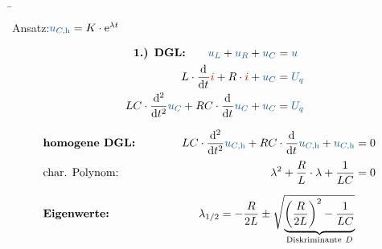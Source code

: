 \begin{frame}\ftx{\subsecname}%
\b{%
\begin{minipage}{\textwidth}\centering
    \begin{minipage}[t][3.5cm][]{0.48\textwidth}\centering
        \vspace{5pt}

        Ansatz:\quad  $\ecv{u_{C,\mathrm{h}}} = K \cdot \mathrm{e}^{\lambda t}$
    \end{minipage}%
    \begin{minipage}[t][3.5cm][]{0.48\textwidth}\centering
    \begin{align*}
        \textbf{1.) DGL:}\qquad
         \ecv{u_L} + \ecv{u_R} +\ecv{u_C} &= \ecv{u} \nonumber\\
        L \cdot \dt \eci{i} + R \cdot \eci{i} + \ecv{u_C}&= \ecv{U_q} \nonumber\\
        LC \cdot \dt[2] \ecv{u_C} + RC \cdot \dt \ecv{u_C} + \ecv{u_C} &= \ecv{U_q} %
    \end{align*}
    \end{minipage}
\end{minipage}\vspace{2pt}

\begin{align*}
    &\textbf{homogene DGL:}&
        LC \cdot \dt[2] \ecv{u_{C,\mathrm{h}}} + RC \cdot \dt \ecv{u_{C,\mathrm{h}}} + \ecv{u_{C,\mathrm{h}}} &= 0  %
        \\[-20pt]
        &\hphantom{R1oooooooooooooooooooo}&\hphantom{L2oooooooooooooooooooooooooooooo}&\hphantom{R2ooo} %
        \\[6pt]
    &\text{char. Polynom:}&
        \lambda^2 + \frac{R}{L} \cdot \lambda + \frac{1}{LC} &= 0 \nonumber\\[6pt]
    &\textbf{Eigenwerte:}&
        \lambda_{1/2} = -\frac{R}{2L} \pm \sqrt{
            \smash{\underbrace{%
            \left(\frac{R}{2L}\right)^2 - \frac{1}{LC}
            }_{\mathclap{\text{Diskriminante}\ D}}}
            \vphantom{\left(\frac{R}{2L}\right)^2 - \frac{1}{LC}}%
        }&
\end{align*}
}%
\end{frame}

